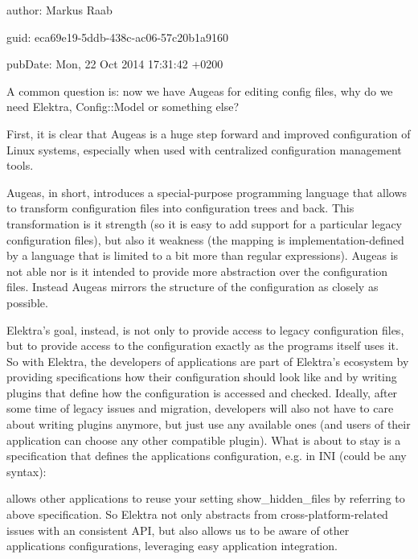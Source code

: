 
\begin{DoxyItemize}
\item author\+: Markus Raab
\item guid\+: eca69e19-\/5ddb-\/438c-\/ac06-\/57c20b1a9160
\item pub\+Date\+: Mon, 22 Oct 2014 17\+:31\+:42 +0200
\end{DoxyItemize}

A common question is\+: now we have Augeas for editing config files, why do we need Elektra, Config\+::\+Model or something else?

First, it is clear that Augeas is a huge step forward and improved configuration of Linux systems, especially when used with centralized configuration management tools.

Augeas, in short, introduces a special-\/purpose programming language that allows to transform configuration files into configuration trees and back. This transformation is it strength (so it is easy to add support for a particular legacy configuration files), but also it weakness (the mapping is implementation-\/defined by a language that is limited to a bit more than regular expressions). Augeas is not able nor is it intended to provide more abstraction over the configuration files. Instead Augeas mirrors the structure of the configuration as closely as possible.

Elektra’s goal, instead, is not only to provide access to legacy configuration files, but to provide access to the configuration exactly as the programs itself uses it. So with Elektra, the developers of applications are part of Elektra’s ecosystem by providing specifications how their configuration should look like and by writing plugins that define how the configuration is accessed and checked. Ideally, after some time of legacy issues and migration, developers will also not have to care about writing plugins anymore, but just use any available ones (and users of their application can choose any other compatible plugin). What is about to stay is a specification that defines the application\textquotesingle{}s configuration, e.\+g. in I\+NI (could be any syntax)\+:


\begin{DoxyCode}{0}
\end{DoxyCode}


allows other applications to reuse your setting show\+\_\+hidden\+\_\+files by referring to above specification. So Elektra not only abstracts from cross-\/platform-\/related issues with an consistent A\+PI, but also allows us to be aware of other applications\textquotesingle{} configurations, leveraging easy application integration.

